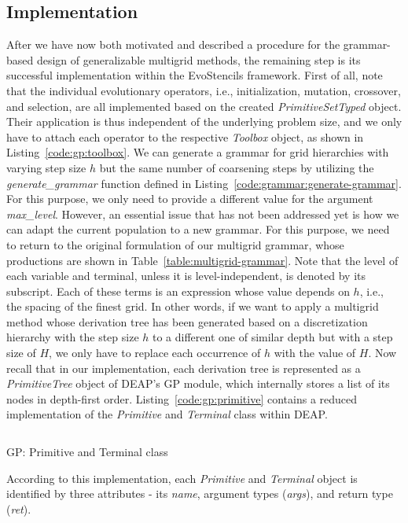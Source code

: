 \subsection{Implementation}
After we have now both motivated and described a procedure for the grammar-based design of generalizable multigrid methods, the remaining step is its successful implementation within the EvoStencils framework.
First of all, note that the individual evolutionary operators, i.e., initialization, mutation, crossover, and selection, are all implemented based on the created \emph{PrimitiveSetTyped} object. 
Their application is thus independent of the underlying problem size, and we only have to attach each operator to the respective \emph{Toolbox} object, as shown in Listing~\ref{code:gp:toolbox}.
We can generate a grammar for grid hierarchies with varying step size $h$ but the same number of coarsening steps by utilizing the \emph{generate\_grammar} function defined in Listing~\ref{code:grammar:generate-grammar}.
For this purpose, we only need to provide a different value for the argument \emph{max\_level}.
However, an essential issue that has not been addressed yet is how we can adapt the current population to a new grammar.
For this purpose, we need to return to the original formulation of our multigrid grammar, whose productions are shown in Table~\ref{table:multigrid-grammar}.
Note that the level of each variable and terminal, unless it is level-independent, is denoted by its subscript.
Each of these terms is an expression whose value depends on $h$, i.e., the spacing of the finest grid.
In other words, if we want to apply a multigrid method whose derivation tree has been generated based on a discretization hierarchy with the step size $h$ to a different one of similar depth but with a step size of $H$, we only have to replace each occurrence of $h$ with the value of $H$.
Now recall that in our implementation, each derivation tree is represented as a \emph{PrimitiveTree} object of DEAP's GP module, which internally stores a list of its nodes in depth-first order.
Listing~\ref{code:gp:primitive} contains a reduced implementation of the \emph{Primitive} and \emph{Terminal} class within DEAP.
\begin{listing}
	\inputminted{python}{evostencils/gp/primitive.py}
	\caption{GP: Primitive and Terminal class}
	\label{code:gp:primitive}
\end{listing}
According to this implementation, each \emph{Primitive} and \emph{Terminal} object is identified by three attributes - its \emph{name}, argument types (\emph{args}), and return type (\emph{ret}).
